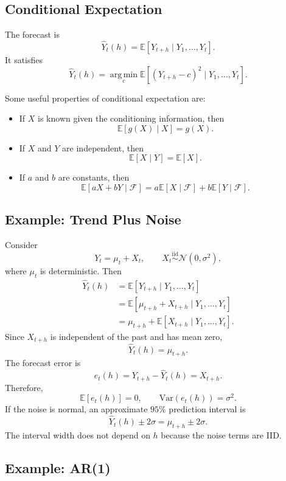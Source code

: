 \documentclass[12pt,oneside]{book}
\numberwithin{equation}{section}
\theoremstyle{definition}
\theoremstyle{plain}
\theoremstyle{remark}
\newcommand{\E}{\mathbb{E}}
\newcommand{\Var}{\mathrm{Var}}
\newcommand{\iid}{\overset{\text{iid}}{\sim}}
\newcommand{\argmin}{\operatorname*{arg\,min}}
\newcommand{\Normal}{\mathcal{N}}
\begin{document}
\subsection*{Conditional Expectation}

The forecast is
\[
\widehat{Y}_t(h)
=
\E[Y_{t+h}\mid Y_1,\ldots,Y_t].
\]
It satisfies
\[
\widehat{Y}_t(h)
=
\argmin_c
\E[(Y_{t+h}-c)^2\mid Y_1,\ldots,Y_t].
\]

Some useful properties of conditional expectation are:

\begin{itemize}
\item If $X$ is known given the conditioning information, then
\[
\E[g(X)\mid X]=g(X).
\]

\item If $X$ and $Y$ are independent, then
\[
\E[X\mid Y]=\E[X].
\]

\item If $a$ and $b$ are constants, then
\[
\E[aX+bY\mid \mathcal{F}]
=
a\E[X\mid \mathcal{F}]
+
b\E[Y\mid \mathcal{F}].
\]
\end{itemize}

\subsection{Example: Trend Plus Noise}

Consider
\[
Y_t=\mu_t+X_t,
\qquad
X_t\iid \Normal(0,\sigma^2),
\]
where $\mu_t$ is deterministic. Then
\begin{align*}
\widehat{Y}_t(h)
&=
\E[Y_{t+h}\mid Y_1,\ldots,Y_t] \\
&=
\E[\mu_{t+h}+X_{t+h}\mid Y_1,\ldots,Y_t] \\
&=
\mu_{t+h}
+
\E[X_{t+h}\mid Y_1,\ldots,Y_t].
\end{align*}
Since $X_{t+h}$ is independent of the past and has mean zero,
\[
\widehat{Y}_t(h)=\mu_{t+h}.
\]
The forecast error is
\[
e_t(h)=Y_{t+h}-\widehat{Y}_t(h)=X_{t+h}.
\]
Therefore,
\[
\E[e_t(h)]=0,
\qquad
\Var(e_t(h))=\sigma^2.
\]
If the noise is normal, an approximate $95\%$ prediction interval is
\[
\widehat{Y}_t(h)\pm 2\sigma
=
\mu_{t+h}\pm 2\sigma.
\]
The interval width does not depend on $h$ because the noise terms are IID.

\subsection*{Example: AR(1)}
\end{document}

